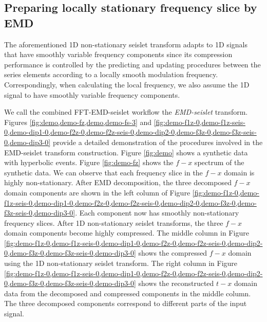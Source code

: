 \subsection{Preparing locally stationary frequency slice by EMD}
The aforementioned 1D non-stationary seislet transform adapts to 1D signals that have smoothly variable  frequency components since its compression performance is controlled by the predicting and updating procedures between the series elements according to a locally smooth modulation frequency. Correspondingly, when calculating the local frequency, we also assume the 1D signal to have smoothly variable frequency components.  

We call the combined FFT-EMD-seislet workflow the \emph{EMD-seislet} transform. Figures \ref{fig:demo,demo-fz,demo,demo-fs-3} and \ref{fig:demo-f1z-0,demo-f1z-seis-0,demo-dip1-0,demo-f2z-0,demo-f2z-seis-0,demo-dip2-0,demo-f3z-0,demo-f3z-seis-0,demo-dip3-0} provide a detailed demonstration of the procedures involved in the EMD-seislet transform construction. Figure \ref{fig:demo} shows a synthetic data with hyperbolic events. Figure \ref{fig:demo-fz} shows the $f-x$ spectrum of the synthetic data.  We can observe that each frequency slice in the $f-x$ domain is highly non-stationary. After EMD decomposition, the three decomposed $f-x$ domain components are shown in the left column of Figure \ref{fig:demo-f1z-0,demo-f1z-seis-0,demo-dip1-0,demo-f2z-0,demo-f2z-seis-0,demo-dip2-0,demo-f3z-0,demo-f3z-seis-0,demo-dip3-0}. Each component now has smoothly non-stationary frequency slices. After 1D non-stationary seislet transforms, the three $f-x$ domain components become highly compressed. The middle column in Figure \ref{fig:demo-f1z-0,demo-f1z-seis-0,demo-dip1-0,demo-f2z-0,demo-f2z-seis-0,demo-dip2-0,demo-f3z-0,demo-f3z-seis-0,demo-dip3-0} shows the compressed $f-x$ domain using the 1D non-stationary seislet transform.  The right column in Figure \ref{fig:demo-f1z-0,demo-f1z-seis-0,demo-dip1-0,demo-f2z-0,demo-f2z-seis-0,demo-dip2-0,demo-f3z-0,demo-f3z-seis-0,demo-dip3-0} shows the reconstructed $t-x$ domain data from the decomposed and compressed components in the middle column. The three decomposed components correspond to different parts of the input signal.%

